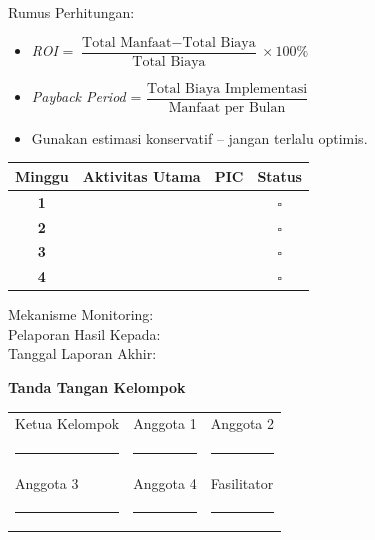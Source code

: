 \documentclass[12pt,a4paper]{report}
\begin{document}
\vspace{0.3cm}

\begin{wstipbox}
Rumus Perhitungan:
\begin{itemize}
    \item \textit{ROI} = $\dfrac{\text{Total Manfaat} - \text{Total Biaya}}{\text{Total Biaya}} \times 100\%$
    \item \textit{Payback Period} = $\dfrac{\text{Total Biaya Implementasi}}{\text{Manfaat per Bulan}}$
    \item Gunakan estimasi konservatif -- jangan terlalu optimis.
\end{itemize}
\end{wstipbox}

\vspace{0.3cm}

\begin{tcolorbox}[colback=plnorange!5, colframe=plnorange, sharp corners, title={\bfseries Action Plan 30 Hari}, boxrule=1pt]

\small
\renewcommand{\arraystretch}{2.2}
\begin{tabularx}{\textwidth}{@{} c >{\raggedright\arraybackslash}X >{\raggedright\arraybackslash}X c @{}}
\toprule
\textbf{Minggu} & \textbf{Aktivitas Utama} & \textbf{PIC} & \textbf{Status} \\
\midrule
\textbf{1} & & & $\square$ \\
\hline
\textbf{2} & & & $\square$ \\
\hline
\textbf{3} & & & $\square$ \\
\hline
\textbf{4} & & & $\square$ \\
\bottomrule
\end{tabularx}
\renewcommand{\arraystretch}{1.0}

\vspace{0.3cm}
\noindent Mekanisme Monitoring: \fillline[8cm]\\[0.2cm]
\noindent Pelaporan Hasil Kepada: \fillline[8cm]\\[0.2cm]
\noindent Tanggal Laporan Akhir: \fillline[8cm]

\end{tcolorbox}

\vspace{0.5cm}

\begin{center}
\begin{tcolorbox}[colback=plngreen!5, colframe=plngreen!70!black, width=0.88\textwidth, sharp corners, boxrule=1pt]
\centering
{\bfseries\color{plngreen!70!black}Tanda Tangan Kelompok}\\[0.5cm]
\begin{tabularx}{0.9\textwidth}{@{} X X X @{}}
\centering Ketua Kelompok & \centering Anggota 1 & \centering Anggota 2 \tabularnewline[1.3cm]
\centering\rule{3cm}{0.3pt} & \centering\rule{3cm}{0.3pt} & \centering\rule{3cm}{0.3pt} \tabularnewline[0.15cm]
\centering Anggota 3 & \centering Anggota 4 & \centering Fasilitator \tabularnewline[1.3cm]
\centering\rule{3cm}{0.3pt} & \centering\rule{3cm}{0.3pt} & \centering\rule{3cm}{0.3pt} \tabularnewline
\end{tabularx}
\end{tcolorbox}
\end{center}
\end{document}
